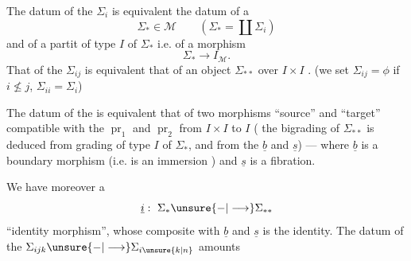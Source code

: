 
The datum of the \(\Sigma_i\) is equivalent  the datum of a
\[
 \Sigma_*\in\mathcal M\qquad
 \left(\Sigma_*=\coprod\Sigma_i\right)
\]
and of a partit of type \(I\) of \(\Sigma_*\) i.e. of a morphism
\[
 \Sigma_*\longrightarrow I_{\mathcal M}.
\]
That of the \(\Sigma_{ij}\) is equivalent  that
of an object \(\Sigma_{**}\)  over \(I\times I\)
.
(we set \(\Sigma_{ij}=\phi\) if \(i\not\le j\),
\(\Sigma_{ii}=\Sigma_i\))

The datum of the
is equivalent  that
of two morphisms ``source'' and ``target''
\diagram{\begin{tikzcd}
 \Sigma_{**}\arrow[r,"\underline b"]\arrow[d,"\underline s"']&\Sigma_*\\
 \Sigma_*&
\end{tikzcd}}
compatible with the \(\operatorname{pr}_1\) and \(\operatorname{pr}_2\)
from \(I\times I\) to \(I\)
(
 the bigrading 
of \(\Sigma_{**}\) is deduced from 
grading of type \(I\) of \(\Sigma_*\), and from the
\(\underline b\) and \(\underline s\)) ---
where \(\underline b\) is 
a boundary morphism (i.e. is an
immersion ) and \(\underline s\) is a fibration.

We have moreover a \unsure{:}
\[
 \underline{i}:\ \Sigma_*\unsure{-|\longrightarrow}\Sigma_{**}
\]
``identity morphism'', whose composite with \(\underline b\) and
\(\underline s\) is the identity. The datum of the
\(\Sigma_{ijk}\unsure{-|\longrightarrow}\Sigma_{i\unsure{k|n}}\) amounts 

